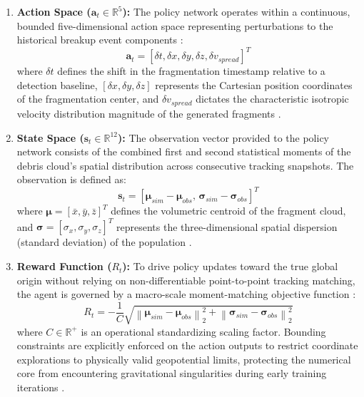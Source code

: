 \documentclass[letterpaper,11pt]{AAS}
\begin{document}
\begin{enumerate}
    \item \textbf{Action Space ($\mathbf{a}_t \in \mathbb{R}^5$):} The policy network operates within a continuous, bounded five-dimensional action space representing perturbations to the historical breakup event components \cite{Abstract_AIAA_ASC_2026.pdf}:
    \begin{equation}
        \mathbf{a}_t = \left[ \delta t, \delta x, \delta y, \delta z, \delta v_{spread} \right]^T
        \label{eq:ppo_action_space}
    \end{equation}
    where $\delta t$ defines the shift in the fragmentation timestamp relative to a detection baseline, $[\delta x, \delta y, \delta z]$ represents the Cartesian position coordinates of the fragmentation center, and $\delta v_{spread} $ dictates the characteristic isotropic velocity distribution magnitude of the generated fragments \cite{Abstract_AIAA_ASC_2026.pdf}.
    
    \item \textbf{State Space ($\mathbf{s}_t \in \mathbb{R}^{12}$):} The observation vector provided to the policy network consists of the combined first and second statistical moments of the debris cloud's spatial distribution across consecutive tracking snapshots. The observation is defined as:
    \begin{equation}
        \mathbf{s}_t = \left[ \boldsymbol{\mu}_{sim} - \boldsymbol{\mu}_{obs}, \, \boldsymbol{\sigma}_{sim} - \boldsymbol{\sigma}_{obs} \right]^T
        \label{eq:ppo_state_space}
    \end{equation}
    where $\boldsymbol{\mu} = [\bar{x}, \bar{y}, \bar{z}]^T$ defines the volumetric centroid of the fragment cloud, and $\boldsymbol{\sigma} = [\sigma_x, \sigma_y, \sigma_z]^T$ represents the three-dimensional spatial dispersion (standard deviation) of the population \cite{Abstract_AIAA_ASC_2026.pdf}.
    
    \item \textbf{Reward Function ($R_t$):} To drive policy updates toward the true global origin without relying on non-differentiable point-to-point tracking matching, the agent is governed by a macro-scale moment-matching objective function \cite{Abstract_AIAA_ASC_2026.pdf}:
    \begin{equation}
        R_t = - \frac{1}{C} \sqrt{ \left\| \boldsymbol{\mu}_{sim} - \boldsymbol{\mu}_{obs} \right\|_2^2 + \left\| \boldsymbol{\sigma}_{sim} - \boldsymbol{\sigma}_{obs} \right\|_2^2 }
        \label{eq:ppo_reward}
    \end{equation}
    where $C \in \mathbb{R}^+$ is an operational standardizing scaling factor. Bounding constraints are explicitly enforced on the action outputs to restrict coordinate explorations to physically valid geopotential limits, protecting the numerical core from encountering gravitational singularities during early training iterations \cite{Abstract_AIAA_ASC_2026.pdf}.
\end{enumerate}
\end{document}
